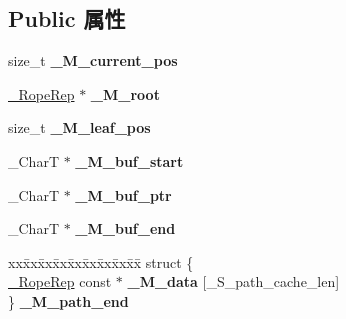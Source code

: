 \subsection*{Public 属性}
\begin{DoxyCompactItemize}
\item 
\mbox{\label{class___rope__iterator__base_a277de2f132d21198fa050d0015c21e6e}} 
size\+\_\+t {\bfseries \+\_\+\+M\+\_\+current\+\_\+pos}
\item 
\mbox{\label{class___rope__iterator__base_aa5d5196121481b3f29f63d057263b6cb}} 
\hyperlink{struct___rope___rope_rep}{\+\_\+\+Rope\+Rep} $\ast$ {\bfseries \+\_\+\+M\+\_\+root}
\item 
\mbox{\label{class___rope__iterator__base_a068938a61833710a258932718ea983e2}} 
size\+\_\+t {\bfseries \+\_\+\+M\+\_\+leaf\+\_\+pos}
\item 
\mbox{\label{class___rope__iterator__base_a37950736bce4fdf980df0e1e5dfb09d3}} 
\+\_\+\+CharT $\ast$ {\bfseries \+\_\+\+M\+\_\+buf\+\_\+start}
\item 
\mbox{\label{class___rope__iterator__base_ad947a6f2661506f7c6e5915cad7d1fc1}} 
\+\_\+\+CharT $\ast$ {\bfseries \+\_\+\+M\+\_\+buf\+\_\+ptr}
\item 
\mbox{\label{class___rope__iterator__base_a11737edb3a62db0592b1914761bf6c1c}} 
\+\_\+\+CharT $\ast$ {\bfseries \+\_\+\+M\+\_\+buf\+\_\+end}
\item 
\mbox{\label{class___rope__iterator__base_a544510df739106ae447209073165a72c}} 
\begin{tabbing}
xx\=xx\=xx\=xx\=xx\=xx\=xx\=xx\=xx\=\kill
struct \{\\
\>\hyperlink{struct___rope___rope_rep}{\_RopeRep} const  $\ast$ {\bfseries \_M\_data} \mbox{[}\_S\_path\_cache\_len\mbox{]}\\
\} {\bfseries \_M\_path\_end}\\


\end{tabbing}
\end{DoxyCompactItemize}
